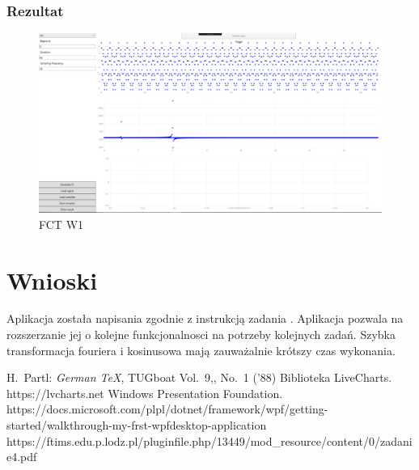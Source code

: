 \documentclass[12pt]{article}
\begin{document}
\subsubsection{Rezultat}
\begin{figure}[H]
 \centering
 \includegraphics[width=14cm]{images/fctw1.PNG}
 \vspace{-0.3cm}
 \caption{FCT W1}
 \label{gui}
\end{figure}

\newpage

\section{Wnioski}

Aplikacja została napisania zgodnie z instrukcją zadania \cite{zad}. Aplikacja pozwala na rozszerzanie jej o kolejne funkcjonalnosci na potrzeby kolejnych zadań.
Szybka transformacja fouriera i kosinusowa mają zauważalnie krótszy czas wykonania.





\begin{thebibliography}{99}
 H.~Partl:
\emph{German \TeX},
TUGboat Vol.~9,, No.~1 ('88)
 Biblioteka LiveCharts. https://lvcharts.net
 Windows Presentation Foundation. https://docs.microsoft.com/plpl/dotnet/framework/wpf/getting-started/walkthrough-my-frst-wpfdesktop-application
 https://ftims.edu.p.lodz.pl/pluginfile.php/13449/mod\_resource/content/0/zadanie4.pdf
\end{thebibliography}
\end{document}
